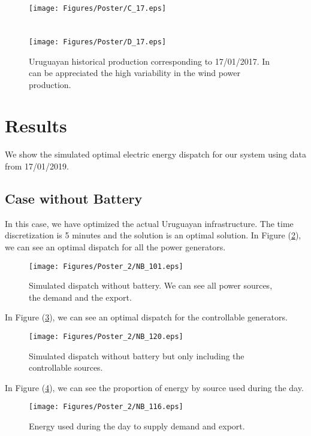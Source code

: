 \documentclass[ima, 20pt, portrait, plainboxedsections]{sciposter}
\begin{document}
\begin{multicols}{3}
\begin{figure}[ht!]
\centering
\texttt{[image: Figures/Poster/C\_17.eps]}\\
\quad\\
\quad\\
\texttt{[image: Figures/Poster/D\_17.eps]}
\caption{Uruguayan historical production corresponding to 17/01/2017. In can be appreciated the high variability in the wind power production.}
\label{Historical}
\end{figure}
 
\section*{Results}

We show the simulated optimal electric energy dispatch for our system using data from 17/01/2019.

\subsection*{Case without Battery}

In this case, we have optimized the actual Uruguayan infrastructure. The time discretization is 5 minutes and the solution is an optimal solution. In Figure (\ref{Balance_NoBatt}), we can see an optimal dispatch for all the power generators.

\begin{figure}[ht!]
\centering
\texttt{[image: Figures/Poster\_2/NB\_101.eps]}
\caption{Simulated dispatch without battery. We can see all power sources, the demand and the export.}
\label{Balance_NoBatt}
\end{figure}

 In Figure (\ref{Balance_NoBatt_Cont}), we can see an optimal dispatch for the controllable generators.

\begin{figure}[ht!]
\centering
\texttt{[image: Figures/Poster\_2/NB\_120.eps]}
\caption{Simulated dispatch without battery but only including the controllable sources.}
\label{Balance_NoBatt_Cont}
\end{figure} 

 In Figure (\ref{Dist_NoBatt}), we can see the proportion of energy by source used during the day.

\begin{figure}[ht!]
\centering
\texttt{[image: Figures/Poster\_2/NB\_116.eps]}
\caption{Energy used during the day to supply demand and export.}
\label{Dist_NoBatt}
\end{figure} 


\end{multicols}
\end{document}
